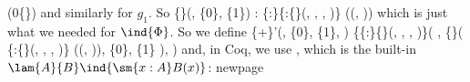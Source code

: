   (0\coqdocvar{\_}\{\})
and similarly for $g_{1}$.  So
  \{\}(, \{0\}, \{1\}) : \{:\}\{:\{\}(, , , )\}
  ((, ))
which is just what we needed for $\ind{\Phi}$.  So we define
  \{+\}'(, \{0\}, \{1\}, )
  \{\{:\}\{\}(, , , )\}(
    ,
    \{\}(
      \{:\{\}(, , , )\} ((, )),
      \{0\},
      \{1\}
    ),
  )
and, in Coq, we use , which is the built-in
$\lam{A}{B}\ind{\sm{x:A}B(x)}$:
newpage


